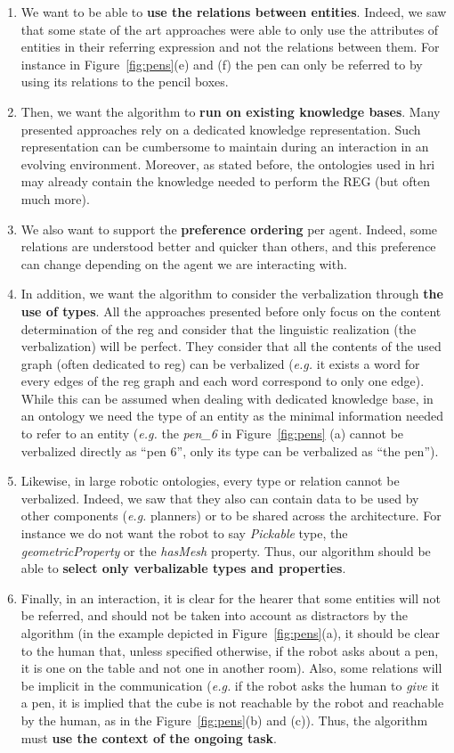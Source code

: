\documentclass[a4paper,11pt,twoside]{StyleThese}
\begin{document}
\begin{enumerate}


\item We want to be able to \textbf{use the relations between entities}. Indeed, we saw that some state of the art approaches were able to only use the attributes of entities in their referring expression and not the relations between them. For instance in Figure~\ref{fig:pens}(e) and (f) the pen can only be referred to by using its relations to the pencil boxes. 
\item Then, we want the algorithm to \textbf{run on existing knowledge bases}. Many presented approaches rely on a dedicated knowledge representation. Such representation can be cumbersome to maintain during an interaction in an evolving environment. Moreover, as stated before, the ontologies used in \acrshort{hri} may already contain the knowledge needed to perform the REG (but often much more). 
\item We also want to support the \textbf{preference ordering} per agent. Indeed, some relations are understood better and quicker than others, and this preference can change depending on the agent we are interacting with. 
\item In addition, we want the algorithm to consider the verbalization through \textbf{the use of types}. All the approaches presented before only focus on the content determination of the \acrshort{reg} and consider that the linguistic realization (the verbalization) will be perfect. They consider that all the contents of the used graph (often dedicated to \acrshort{reg}) can be verbalized (\textit{e.g.} it exists a word for every edges of the \acrshort{reg} graph and each word correspond to only one edge). While this can be assumed when dealing with dedicated knowledge base, in an ontology we need the type of an entity as the minimal information needed to refer to an entity (\textit{e.g.} the \textit{pen\_6} in Figure~\ref{fig:pens} (a) cannot be verbalized directly as ``pen 6'', only its type can be verbalized as ``the pen'').
\item Likewise, in large robotic ontologies, every type or relation cannot be verbalized. Indeed, we saw that they also can contain data to be used by other components (\textit{e.g.} planners) or to be shared across the architecture. For instance we do not want the robot to say \textit{Pickable} type, the \textit{geometricProperty} or the \textit{hasMesh} property. Thus, our algorithm should be able to \textbf{select only verbalizable types and properties}.
\item Finally, in an interaction, it is clear for the hearer that some entities will not be referred, and should not be taken into account as distractors by the algorithm (in the example depicted in Figure~\ref{fig:pens}(a), it should be clear to the human that, unless specified otherwise, if the robot asks about a pen, it is one on the table and not one in another room). Also, some relations will be implicit in the communication (\textit{e.g.} if the robot asks the human to \textit{give} it a pen, it is implied that the cube is not reachable by the robot and reachable by the human, as in the Figure~\ref{fig:pens}(b) and (c)). Thus, the algorithm must \textbf{use the context of the ongoing task}. 

\end{enumerate}
\end{document}
